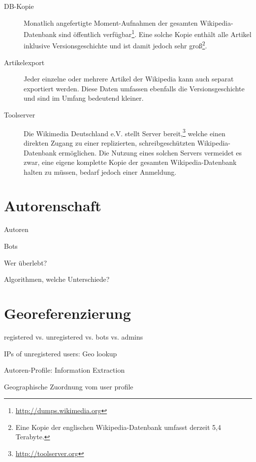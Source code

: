 \begin{description}
\item[DB-Kopie] Monatlich angefertigte Moment-Aufnahmen der gesamten Wikipedia-Datenbank sind öffentlich verfügbar\footnote{\url{http://dumps.wikimedia.org}}. Eine solche Kopie enthält alle Artikel inklusive Versionsgeschichte und ist damit jedoch sehr groß\footnote{Eine Kopie der englischen Wikipedia-Datenbank umfasst derzeit 5,4 Terabyte.}.
\item[Artikelexport] Jeder einzelne oder mehrere Artikel der Wikipedia kann auch separat exportiert werden. Diese Daten umfassen ebenfalls die Versionsgeschichte und sind im Umfang bedeutend kleiner.
\item[Toolserver] Die Wikimedia Deutschland e.V. stellt Server bereit,\footnote{\url{http://toolserver.org}} welche einen direkten Zugang zu einer replizierten, schreibgeschützten Wikipedia-Datenbank ermöglichen. Die Nutzung eines solchen Servers vermeidet es zwar, eine eigene komplette Kopie der gesamten Wikipedia-Datenbank halten zu müssen, bedarf jedoch einer Anmeldung.
\end{description}



\section{Autorenschaft}


\begin{todos}
    \item Autoren
    \item Bots
    \item Wer überlebt?
    \item Algorithmen, welche Unterschiede?
\end{todos}



\section{Georeferenzierung}

\begin{todos}
    \item registered vs. unregistered vs. bots vs. admins
    \item IPs of unregistered users: Geo lookup
    \item Autoren-Profile: Information Extraction
    \item Geographische Zuordnung vom user profile
\end{todos}


